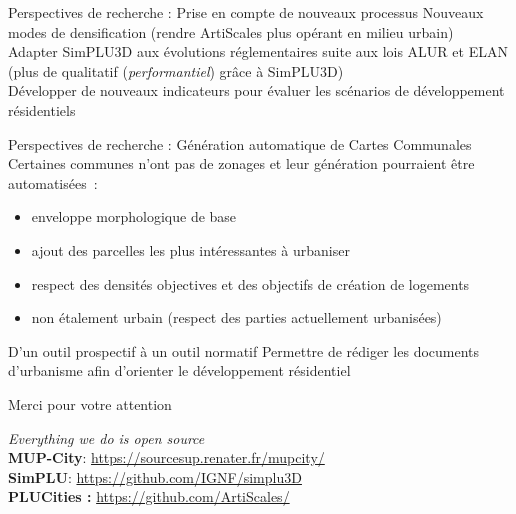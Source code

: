 \documentclass[xcolor=table]{beamer}
\begin{document}
\begin{frame}{Perspectives de recherche : Prise en compte de nouveaux processus}
	Nouveaux modes de densification (rendre ArtiScales plus opérant en milieu urbain)
	\\
	Adapter SimPLU3D aux évolutions réglementaires suite aux lois ALUR et ELAN (plus de qualitatif (\textit{performantiel}) grâce à SimPLU3D)
	\\
	Développer de nouveaux indicateurs pour évaluer les scénarios de développement résidentiels
\end{frame}

\begin{frame}{Perspectives de recherche : Génération automatique de Cartes Communales}
	Certaines communes n'ont pas de zonages et leur génération pourraient être automatisées~:
	\begin{itemize}
		\item<2-> enveloppe morphologique de base
		\item<3-> ajout des parcelles les plus intéressantes à urbaniser 
		\item<4-> respect des densités objectives et des objectifs de création de logements
		\item<5-> non étalement urbain (respect des parties actuellement urbanisées)
	\end{itemize}
\end{frame}

\begin{frame}{D'un outil prospectif à un outil normatif}
	Permettre de rédiger les documents d'urbanisme afin d'orienter le développement résidentiel
\end{frame}
\begin{frame}[standout]
	\centering
	\begin{block}{}	
		\centering	
		Merci pour votre attention
	\end{block}
	\begin{block}{}
		\centering
		\textit{Everything we do is open source}\\
		\large
		\textbf{MUP-City}: \url{https://sourcesup.renater.fr/mupcity/} \\
		\textbf{SimPLU}: \url{https://github.com/IGNF/simplu3D}\\
		\textbf{PLUCities :} \url{https://github.com/ArtiScales/}
	\end{block}
\end{frame}
\end{document}
